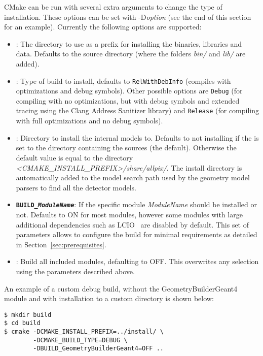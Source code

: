 CMake can be run with several extra arguments to change the type of installation.
These options can be set with -D\textit{option} (see the end of this section for an example).
Currently the following options are supported:
\begin{itemize}
\item {}: The directory to use as a prefix for installing the binaries, libraries and data.
Defaults to the source directory (where the folders \textit{bin/} and \textit{lib/} are added).
\item {}: Type of build to install, defaults to \texttt{RelWithDebInfo} (compiles with optimizations and debug symbols).
Other possible options are \texttt{Debug} (for compiling with no optimizations, but with debug symbols and extended tracing using the Clang Address Sanitizer library) and \texttt{Release} (for compiling with full optimizations and no debug symbols).
\item {}: Directory to install the internal models to.
Defaults to not installing if the  is set to the directory containing the sources (the default).
Otherwise the default value is equal to the directory \textit{<CMAKE\_INSTALL\_PREFIX>/share/allpix/}.
The install directory is automatically added to the model search path used by the geometry model parsers to find all the detector models.
\item \textbf{\texttt{BUILD\_\textit{ModuleName}}}: If the specific module \textit{ModuleName} should be installed or not.
Defaults to ON for most modules, however some modules with large additional dependencies such as LCIO~\cite{lcio} are disabled by default.
This set of parameters allows to configure the build for minimal requirements as detailed in Section~\ref{sec:prerequisites}.
\item {}: Build all included modules, defaulting to OFF.
This overwrites any selection using the parameters described above.
\end{itemize}

An example of a custom debug build, without the GeometryBuilderGeant4 module and with installation to a custom directory is shown below:
\begin{verbatim}
$ mkdir build
$ cd build
$ cmake -DCMAKE_INSTALL_PREFIX=../install/ \
        -DCMAKE_BUILD_TYPE=DEBUG \
        -DBUILD_GeometryBuilderGeant4=OFF ..
\end{verbatim}

